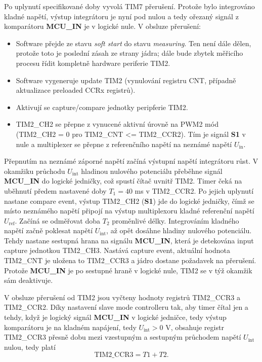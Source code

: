 \documentclass[twoside]{article}
\begin{document}
Po uplynutí specifikované doby vyvolá TIM7 přerušení. Protože bylo integrováno kladné napětí, výstup integrátoru je nyní pod nulou a tedy ořezaný signál z komparátoru
\textbf{MCU\_IN} je v logické nule. V obsluze přerušení:
\begin{itemize}
    \item Software přejde ze stavu \textit{soft start} do stavu \textit{measuring}.
    Ten není dále dělen, protože toto je poslední zásah ze strany jádra; dále bude zbytek měřicího procesu řídit kompletně hardware periferie TIM2.
    \item Software vygeneruje update TIM2 (vynulování registru CNT, případně aktualizace preloaded CCRx registrů).
    \item Aktivují se capture/compare jednotky peripferie TIM2.
    \item TIM2\_CH2 se přepne z vynucené aktivní úrovně na PWM2 mód (TIM2\_CH2 = 0 pro TIM2\_CNT <= TIM2\_CCR2).
    Tím je signál \textbf{S1} v nule a multiplexer se přepne z referenčního napětí na neznámé napětí $U_{\text{in}}$.
\end{itemize}
Přepnutím na neznámé záporné napětí začíná výstupní napětí integrátoru růst. V okamžiku průchodu $U_{\text{int}}$ hladinou nulového potenciálu přeběhne signál \textbf{MCU\_IN}
do logické jedničky, což spustí čítač uvnitř TIM2. Timer čeká na uběhnutí předem nastavené doby $T_1 = 40$ ms v TIM2\_CCR2. Po jejich uplynutí nastane compare event,
výstup TIM2\_CH2 (\textbf{S1}) jde do logické jedničky, čímž se místo neznámého napětí připojí na výstup multiplexoru kladné referenční napětí $U_{\text{ref}}$.
Začíná se odměřovat doba $T_2$ proměnlivé délky.
Integrováním kladného napětí začně poklesat napětí $U_{\text{int}}$, až opět dosáhne hladiny nulového potenciálu. Tehdy nastane sestupná hrana na signálu \textbf{MCU\_IN}, která
je detekována input capture jednotkou TIM2\_CH3. Nastává capture event, aktuální hodnota TIM2\_CNT je uložena to TIM2\_CCR3 a jádro dostane požadavek na přerušení.
Protože \textbf{MCU\_IN} je po sestupné hraně v logické nule, TIM2 se v týž okamžik sám deaktivuje.

V obsluze přerušení od TIM2 jsou vyčteny hodnoty registrů TIM2\_CCR3 a TIM2\_CCR2. Díky nastavení slave mode controlleru tak, aby timer čítal jen a tehdy, když je logický signál \textbf{MCU\_IN}
v logické jedničce, tedy výstup komparátoru je na kladném napájení, tedy $U_{\text{int}} > 0$ V, obsahuje registr TIM2\_CCR3 přesně dobu mezi vzestupným a sestupným průchodem napětí $U_{\text{int}}$ nulou,
tedy platí
\begin{equation}
    \text{TIM2\_CCR3} = T1 + T2.
\end{equation}
\end{document}
